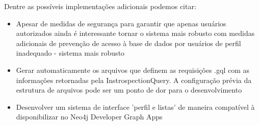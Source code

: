 Dentre as possíveis implementações adicionais podemos citar:
\begin{itemize}
    \item Apesar de medidas de segurança para garantir que apenas usuários autorizados  ainda é interessante tornar o sistema mais robusto com medidas adicionais de prevenção de acesso à base de dados por usuários de perfil inadequado
- sistema mais robusto
    \item Gerar automaticamente os arquivos que definem as requisições .gql com as informações retornadas pela InstrospectionQuery. A configuração prévia da estrutura de arquivos pode ser um ponto de dor para o desenvolvimento ~
    \item Desenvolver um sistema de interface 'perfil e listas' de maneira compatível à disponibilizar no Neo4j Developer Graph Apps 
\end{itemize}



